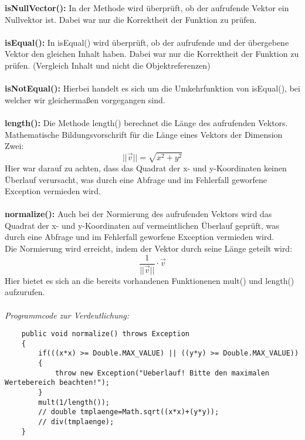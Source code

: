\documentclass[a4paper,11pt]{scrartcl}
\begin{document}
\textbf{isNullVector(): } In der Methode wird überprüft, ob der aufrufende Vektor ein Nullvektor ist. Dabei war nur die Korrektheit der Funktion zu prüfen.\\
\\
\textbf{isEqual(): } In isEqual() wird überprüft, ob der aufrufende und der übergebene Vektor den gleichen Inhalt haben. Dabei war nur die Korrektheit der Funktion zu prüfen. (Vergleich Inhalt und nicht die Objektreferenzen)\\
\\
\textbf{isNotEqual(): } Hierbei handelt es sich um die Umkehrfunktion von isEqual(), bei welcher wir gleichermaßen vorgegangen sind.\\
\\
\textbf{length(): } Die Methode length() berechnet die Länge des aufrufenden Vektors.\\
Mathematische Bildungsvorschrift für die Länge eines Vektors der Dimension Zwei:
\[ ||\vec v|| = \sqrt{x^2 + y^2} \]
Hier war darauf zu achten, dass das Quadrat der x- und y-Koordinaten keinen Überlauf verursacht, was durch eine Abfrage und im Fehlerfall geworfene Exception vermieden wird.\\
\\
\textbf{normalize(): } Auch bei der Normierung des aufrufenden Vektors wird das Quadrat der x- und y-Koordinaten auf vermeintlichen Überlauf geprüft, was durch eine Abfrage und im Fehlerfall geworfene Exception vermieden wird.\\
Die Normierung wird erreicht, indem der Vektor durch seine Länge geteilt wird:
\[ \frac{1}{||\vec v||} \cdot \vec v \]
Hier bietet es sich an die bereits vorhandenen Funktionenen mult() und length() aufzurufen.\\
\\
\textit{Programmcode zur Verdeutlichung:}
\begin{lstlisting}
	public void normalize() throws Exception
	{
		if(((x*x) >= Double.MAX_VALUE) || ((y*y) >= Double.MAX_VALUE))
		{
			throw new Exception("Ueberlauf! Bitte den maximalen Wertebereich beachten!");
		}
		mult(1/length());
		// double tmplaenge=Math.sqrt((x*x)+(y*y)); 		
		// div(tmplaenge);
	}
\end{lstlisting}
\end{document}
